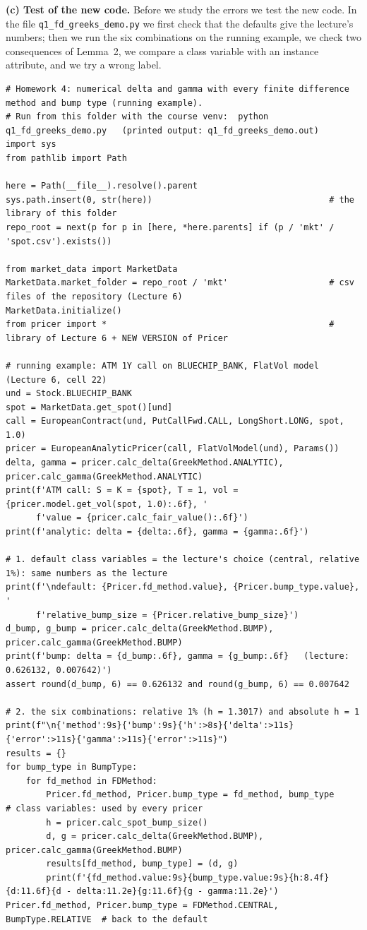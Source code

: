 \documentclass[11pt,a4paper]{article}
\newcommand{\step}[1]{\par\smallskip\noindent\textbf{#1}\enspace\ignorespaces}
\begin{document}
\step{(c) Test of the new code.} Before we study the errors we test the new code. In the file \texttt{q1\_fd\_greeks\_demo.py} we first check that the defaults give the lecture's numbers; then we run the six combinations on the running example, we check two consequences of Lemma~2, we compare a class variable with an instance attribute, and we try a wrong label.
\begin{lstlisting}[style=pysmall]
# Homework 4: numerical delta and gamma with every finite difference method and bump type (running example).
# Run from this folder with the course venv:  python q1_fd_greeks_demo.py   (printed output: q1_fd_greeks_demo.out)
import sys
from pathlib import Path

here = Path(__file__).resolve().parent
sys.path.insert(0, str(here))                                   # the library of this folder
repo_root = next(p for p in [here, *here.parents] if (p / 'mkt' / 'spot.csv').exists())

from market_data import MarketData
MarketData.market_folder = repo_root / 'mkt'                    # csv files of the repository (Lecture 6)
MarketData.initialize()
from pricer import *                                            # library of Lecture 6 + NEW VERSION of Pricer

# running example: ATM 1Y call on BLUECHIP_BANK, FlatVol model (Lecture 6, cell 22)
und = Stock.BLUECHIP_BANK
spot = MarketData.get_spot()[und]
call = EuropeanContract(und, PutCallFwd.CALL, LongShort.LONG, spot, 1.0)
pricer = EuropeanAnalyticPricer(call, FlatVolModel(und), Params())
delta, gamma = pricer.calc_delta(GreekMethod.ANALYTIC), pricer.calc_gamma(GreekMethod.ANALYTIC)
print(f'ATM call: S = K = {spot}, T = 1, vol = {pricer.model.get_vol(spot, 1.0):.6f}, '
      f'value = {pricer.calc_fair_value():.6f}')
print(f'analytic: delta = {delta:.6f}, gamma = {gamma:.6f}')

# 1. default class variables = the lecture's choice (central, relative 1%): same numbers as the lecture
print(f'\ndefault: {Pricer.fd_method.value}, {Pricer.bump_type.value}, '
      f'relative_bump_size = {Pricer.relative_bump_size}')
d_bump, g_bump = pricer.calc_delta(GreekMethod.BUMP), pricer.calc_gamma(GreekMethod.BUMP)
print(f'bump: delta = {d_bump:.6f}, gamma = {g_bump:.6f}   (lecture: 0.626132, 0.007642)')
assert round(d_bump, 6) == 0.626132 and round(g_bump, 6) == 0.007642

# 2. the six combinations: relative 1% (h = 1.3017) and absolute h = 1
print(f"\n{'method':9s}{'bump':9s}{'h':>8s}{'delta':>11s}{'error':>11s}{'gamma':>11s}{'error':>11s}")
results = {}
for bump_type in BumpType:
    for fd_method in FDMethod:
        Pricer.fd_method, Pricer.bump_type = fd_method, bump_type     # class variables: used by every pricer
        h = pricer.calc_spot_bump_size()
        d, g = pricer.calc_delta(GreekMethod.BUMP), pricer.calc_gamma(GreekMethod.BUMP)
        results[fd_method, bump_type] = (d, g)
        print(f'{fd_method.value:9s}{bump_type.value:9s}{h:8.4f}{d:11.6f}{d - delta:11.2e}{g:11.6f}{g - gamma:11.2e}')
Pricer.fd_method, Pricer.bump_type = FDMethod.CENTRAL, BumpType.RELATIVE  # back to the default


\end{lstlisting}
\end{document}

